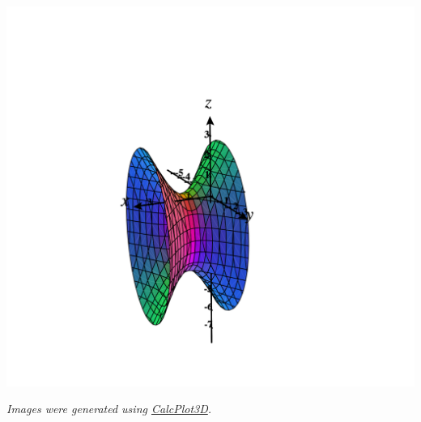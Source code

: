 \documentclass{ximera}
\begin{document}
\begin{example}
\begin{image}
\includegraphics[width = \textwidth]{CalcPlot3D-shifted_hyperboloid}
\end{image}
\end{example}

\textit{Images were generated using \href{https://www.monroecc.edu/faculty/paulseeburger/calcnsf/CalcPlot3D/}{CalcPlot3D}.}
\end{document}
